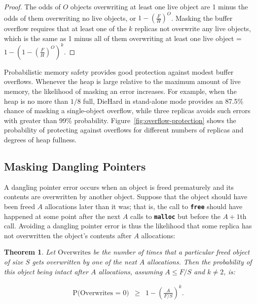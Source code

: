 \documentclass{sig-alternate}
\newtheorem{thm}{Theorem}
\newcommand{\cfunction}[1]{{\bf \tt #1}}
\newcommand{\malloc}{\cfunction{malloc}}
\newcommand{\free}{\cfunction{free}}
\begin{document}
\vskip -20pt

\begin{proof}
The odds of $O$ objects overwriting at least one live object
are 1 minus the odds of them overwriting no live objects, or $1 -
(\frac{F}{H})^{O}$. Masking the buffer overflow requires that at
least one of the $k$ replicas not overwrite any live objects, which is
the same as 1 minus all of them overwriting at least one live object =
$1 - (1 - (\frac{F}{H})^{O})^k$.

\end{proof}

Probabilistic memory safety provides good protection against modest
buffer overflows. Whenever the heap is large relative to the maximum
amount of live memory, the likelihood of masking an error increases.
For example, when the heap is no more than $1/8$ full, DieHard in
stand-alone mode provides an 87.5\% chance of masking a single-object
overflow, while three replicas avoids such errors with greater than
99\% probability. Figure~\ref{fig:overflow-protection} shows the
probability of protecting against overflows for different numbers of
replicas and degrees of heap fullness.

\subsection{Masking Dangling Pointers}

\noindent
A dangling pointer error occurs when an object is freed prematurely
and its contents are overwritten by another object. Suppose that the
object should have been freed $A$ allocations later than it was; that
is, the call to \free{} should have happened at some point after the
next $A$ calls to \malloc{} but before the $A+1$th call. Avoiding a
dangling pointer error is thus the likelihood that some replica has
not overwritten the object's contents after $A$ allocations:

\begin{thm}
Let $\mbox{Overwrites}$ be the number of times that a particular freed
object of size $S$ gets overwritten by one of the next $A$
allocations. Then the probability of this object being intact after
$A$ allocations, assuming $A \leq F/S$ and $k \neq 2$, is:

\begin{eqnarray*}
\mbox{P(Overwrites = 0)} & \geq & 1 - \left(\frac{A}{F/S}\right)^k.
\end{eqnarray*}
\label{thm:masking_dangling_immediate}
\end{thm}
\end{document}
